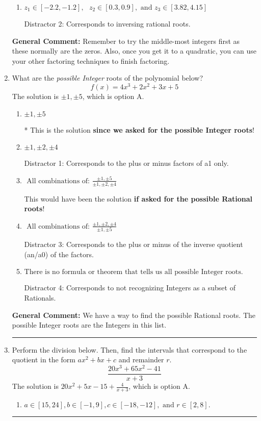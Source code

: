 \documentclass{extbook}[14pt]
\newcommand{\litem}[1]{\item #1

\rule{\textwidth}{0.4pt}}
\begin{document}
\begin{enumerate}
{\begin{enumerate}[label=\Alph*.]
 Distractor 1: Corresponds to negatives of all zeros.
\item \( z_1 \in [-2.2, -1.2], \text{   }  z_2 \in [0.3, 0.9], \text{   and   } z_3 \in [3.82, 4.15] \)

 Distractor 2: Corresponds to inversing rational roots.
\end{enumerate}

\textbf{General Comment:} Remember to try the middle-most integers first as these normally are the zeros. Also, once you get it to a quadratic, you can use your other factoring techniques to finish factoring.
}
\litem{
What are the \textit{possible Integer} roots of the polynomial below?
\[ f(x) = 4x^{3} +2 x^{2} +3 x + 5 \]The solution is \( \pm 1,\pm 5 \), which is option A.\begin{enumerate}[label=\Alph*.]
\item \( \pm 1,\pm 5 \)

* This is the solution \textbf{since we asked for the possible Integer roots}!
\item \( \pm 1,\pm 2,\pm 4 \)

 Distractor 1: Corresponds to the plus or minus factors of a1 only.
\item \( \text{ All combinations of: }\frac{\pm 1,\pm 5}{\pm 1,\pm 2,\pm 4} \)

This would have been the solution \textbf{if asked for the possible Rational roots}!
\item \( \text{ All combinations of: }\frac{\pm 1,\pm 2,\pm 4}{\pm 1,\pm 5} \)

 Distractor 3: Corresponds to the plus or minus of the inverse quotient (an/a0) of the factors. 
\item \( \text{There is no formula or theorem that tells us all possible Integer roots.} \)

 Distractor 4: Corresponds to not recognizing Integers as a subset of Rationals.
\end{enumerate}

\textbf{General Comment:} We have a way to find the possible Rational roots. The possible Integer roots are the Integers in this list.
}
\litem{
Perform the division below. Then, find the intervals that correspond to the quotient in the form $ax^2+bx+c$ and remainder $r$.
\[ \frac{20x^{3} +65 x^{2} -41}{x + 3} \]The solution is \( 20x^{2} +5 x -15 + \frac{4}{x + 3} \), which is option A.\begin{enumerate}[label=\Alph*.]
\item \( a \in [15, 24], b \in [-1, 9], c \in [-18, -12], \text{ and } r \in [2, 8]. \)


\end{enumerate}}
\end{enumerate}
\end{document}
